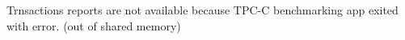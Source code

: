 \documentclass[../../main.tex]{subfiles}
\begin{document}
    Trnsactions reports are not available because TPC-C benchmarking app exited with error. (out of shared memory)
\end{document}
